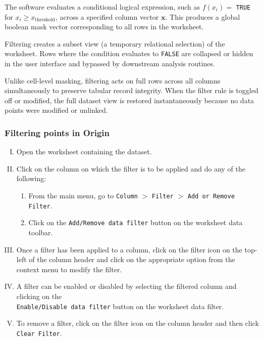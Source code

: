 		The software evaluates a conditional logical expression, such as $f(x_i)=$ \verb|TRUE| for $x_i\geqslant x_{\text{threshold}}$, across a specified column vector $\mathbf{x}$. This produces a global boolean mask vector corresponding to all rows in the worksheet.
		
		Filtering creates a subset view (a temporary relational selection) of the worksheet. Rows where the condition evaluates to \verb|FALSE| are collapsed or hidden in the user interface and bypassed by downstream analysis routines.
		
		Unlike cell-level masking, filtering acts on full rows across all columns simultaneously to preserve tabular record integrity. When the filter rule is toggled off or modified, the full dataset view is restored instantaneously because no data points were modified or unlinked.
		
		\subsubsection{Filtering points in Origin}
			\begin{enumerate}[I.]
				\item Open the worksheet containing the dataset.
				
				\item Click on the column on which the filter is to be applied and do any of the following:
				\begin{enumerate}
					\item From the main menu, go to \verb|Column| $>$ \verb|Filter| $>$ \verb|Add or Remove Filter|.
					\item Click on the \verb|Add/Remove data filter| button on the worksheet data toolbar.
				\end{enumerate}
				
				\item Once a filter has been applied to a column, click on the filter icon on the top-left of the column header and click on the appropriate option from the context menu to modify the filter.
				
				\item A filter can be enabled or disabled by selecting the filtered column and clicking on the\\ \verb|Enable/Disable data filter| button on the worksheet data filter.
				
				\item To remove a filter, click on the filter icon on the column header and then click \verb|Clear Filter|.
			\end{enumerate}
			
